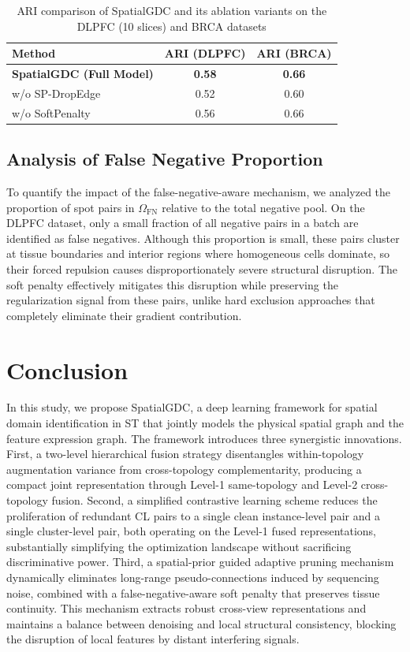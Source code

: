 \documentclass[lettersize,journal]{IEEEtran}
\begin{document}
\begin{table}[htbp]
\centering
\caption{ARI comparison of SpatialGDC and its ablation variants on the DLPFC (10 slices) and BRCA datasets}
\label{tab:ablation}
\begin{tabular}{lcc}
\toprule
\textbf{Method} & \textbf{ARI (DLPFC)} & \textbf{ARI (BRCA)} \\
\midrule
\textbf{SpatialGDC (Full Model)} & \textbf{0.58} & \textbf{0.66} \\
w/o SP-DropEdge & 0.52 & 0.60 \\
w/o SoftPenalty & 0.56 & 0.66 \\
\bottomrule
\end{tabular}
\end{table}

\subsection{Analysis of False Negative Proportion}
To quantify the impact of the false-negative-aware mechanism, we analyzed the proportion of spot pairs in $\Omega_{\text{FN}}$ relative to the total negative pool. On the DLPFC dataset, only a small fraction of all negative pairs in a batch are identified as false negatives. Although this proportion is small, these pairs cluster at tissue boundaries and interior regions where homogeneous cells dominate, so their forced repulsion causes disproportionately severe structural disruption. The soft penalty effectively mitigates this disruption while preserving the regularization signal from these pairs, unlike hard exclusion approaches that completely eliminate their gradient contribution.

\section{Conclusion}
\label{sec:conclusion}

In this study, we propose SpatialGDC, a deep learning framework for spatial domain identification in ST that jointly models the physical spatial graph and the feature expression graph. The framework introduces three synergistic innovations. First, a two-level hierarchical fusion strategy disentangles within-topology augmentation variance from cross-topology complementarity, producing a compact joint representation through Level-1 same-topology and Level-2 cross-topology fusion. Second, a simplified contrastive learning scheme reduces the proliferation of redundant CL pairs to a single clean instance-level pair and a single cluster-level pair, both operating on the Level-1 fused representations, substantially simplifying the optimization landscape without sacrificing discriminative power. Third, a spatial-prior guided adaptive pruning mechanism dynamically eliminates long-range pseudo-connections induced by sequencing noise, combined with a false-negative-aware soft penalty that preserves tissue continuity. This mechanism extracts robust cross-view representations and maintains a balance between denoising and local structural consistency, blocking the disruption of local features by distant interfering signals.
\end{document}
